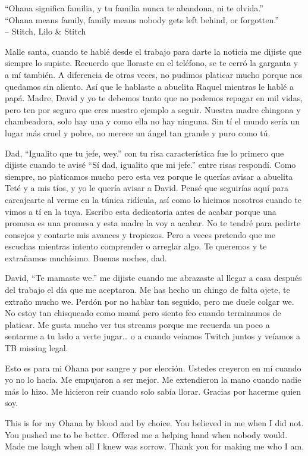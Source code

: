 \begin{frontmatter}[Dedication]
    \centering
    ``Ohana significa familia, y tu familia nunca te abandona, ni te olvida.''\\
    ``Ohana means family, family means nobody gets left behind, or forgotten.''\\
    -- Stitch, Lilo \& Stitch

    \justify
    Malle santa, cuando te hablé desde el trabajo para darte la noticia me dijiste que siempre lo supiste. Recuerdo que lloraste en el teléfono, se te cerró la garganta y a mí también. A diferencia de otras veces, no pudimos platicar mucho porque nos quedamos sin aliento. Así que le hablaste a abuelita Raquel mientras le hablé a papá. Madre, David y yo te debemos tanto que no podemos repagar en mil vidas, pero ten por seguro que eres nuestro ejemplo a seguir. Nuestra madre chingona y chambeadora, solo hay una y como ella no hay ninguna. Sin tí el mundo sería un lugar más cruel y pobre, no merece un ángel tan grande y puro como tú.

    Dad, ``Igualito que tu jefe, wey.'' con tu risa característica fue lo primero que dijiste cuando te avisé ``Sí dad, igualito que mi jefe.'' entre risas respondí. Como siempre, no platicamos mucho pero esta vez porque le querías avisar a abuelita Teté y a mis tíos, y yo le quería avisar a David. Pensé que seguirías aquí para carcajearte al verme en la túnica ridícula, así como lo hicimos nosotros cuando te vimos a tí en la tuya. Escribo esta dedicatoria antes de acabar porque una promesa es una promesa y esta madre la voy a acabar. No te tendré para pedirte consejos y contarte mis avances y tropiezos. Pero a veces pretendo que me escuchas mientras intento comprender o arreglar algo. Te queremos y te extrañamos muchísimo. Buenas noches, dad.

    David, ``Te mamaste we.'' me dijiste cuando me abrazaste al llegar a casa después del trabajo el día que me aceptaron. Me has hecho un chingo de falta ojete, te extraño mucho we. Perdón por no hablar tan seguido, pero me duele colgar we. No estoy tan chisqueado como mamá pero siento feo cuando terminamos de platicar. Me gusta mucho ver tus streams porque me recuerda un poco a sentarme a tu lado a verte jugar\ldots{} o a cuando veíamos Twitch juntos y veíamos a TB missing legal.

    Esto es para mi Ohana por sangre y por elección. Ustedes creyeron en mí cuando yo no lo hacía. Me empujaron a ser mejor. Me extendieron la mano cuando nadie más lo hizo. Me hicieron reir cuando solo sabía llorar. Gracias por hacerme quien soy.

    This is for my Ohana by blood and by choice. You believed in me when I did not. You pushed me to be better. Offered me a helping hand when nobody would. Made me laugh when all I knew was sorrow. Thank you for making me who I am.
\end{frontmatter}

